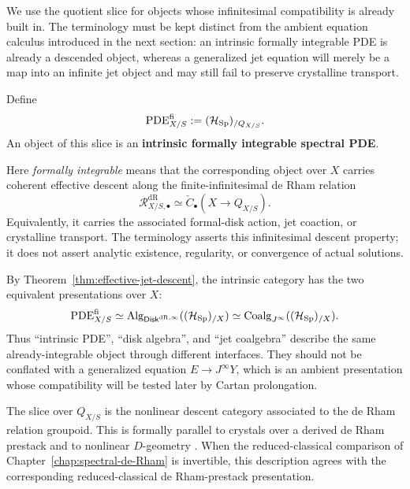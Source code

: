 We use the quotient slice for objects whose infinitesimal compatibility is
already built in. The terminology must be kept distinct from the ambient
equation calculus introduced in the next section: an intrinsic formally
integrable PDE is already a descended object, whereas a generalized jet
equation will merely be a map into an infinite jet object and may still fail
to preserve crystalline transport.
\begin{definition}
Define
\[
  \operatorname{PDE}^{\mathrm{fi}}_{X/S}
  :=
  (\mathcal H_{\operatorname{Sp}})_{/Q_{X/S}}.
\]
An object of this slice is an \textbf{intrinsic formally integrable spectral
PDE}.

Here \emph{formally integrable} means that the corresponding object over \(X\)
carries coherent effective descent along the finite-infinitesimal de Rham
relation
\[
  \mathcal R^{\mathrm{dR}}_{X/S,\bullet}
  \simeq
  \check C_\bullet(X\to Q_{X/S}).
\]
Equivalently, it carries the associated formal-disk action, jet coaction, or
crystalline transport. The terminology asserts this infinitesimal descent
property; it does not assert analytic existence, regularity, or convergence of
actual solutions.
\end{definition}
By Theorem~\ref{thm:effective-jet-descent}, the intrinsic category has the two
equivalent presentations over \(X\):
\[
  \operatorname{PDE}^{\mathrm{fi}}_{X/S}
  \simeq
  \operatorname{Alg}_{\mathsf{Disk}^{\mathrm{dR},\infty}}
  ((\mathcal H_{\operatorname{Sp}})_{/X})
  \simeq
  \operatorname{Coalg}_{J^\infty}
  ((\mathcal H_{\operatorname{Sp}})_{/X}).
\]
Thus ``intrinsic PDE'', ``disk algebra'', and ``jet coalgebra'' describe the
same already-integrable object through different interfaces. They should not
be conflated with a generalized equation \(E\to J^\infty Y\), which is an
ambient presentation whose compatibility will be tested later by Cartan
prolongation.
\begin{remark}
The slice over \(Q_{X/S}\) is the nonlinear descent category associated to the
de Rham relation groupoid. This is formally parallel to crystals over a
derived de Rham prestack and to nonlinear \(D\)-geometry
\cite{GaitsgoryRozenblyumCrystals,BeilinsonDrinfeld2004}. When the reduced-classical comparison of
Chapter~\ref{chap:spectral-de-Rham} is invertible, this description agrees with
the corresponding reduced-classical de Rham-prestack presentation.
\end{remark}

